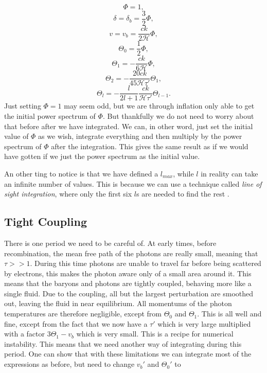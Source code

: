 \documentclass[a4paper,norsk, 10pt]{article}
\begin{document}
\begin{equation}
\Phi = 1,
\end{equation}
\begin{equation}
\delta = \delta_b = \frac{3}{2}\Phi,
\end{equation}
\begin{equation}
v = v_b = \frac{ck}{2\mathcal{H}}\Phi,
\end{equation}
\begin{equation}
\Theta_0 = \frac{1}{2}\Phi,
\end{equation}
\begin{equation}
\Theta_1 = -\frac{ck}{6\mathcal{H}}\Phi,
\end{equation}
\begin{equation}
\Theta_2 = -\frac{20ck}{45\mathcal{H}\tau'}\Theta_1,
\end{equation}
\begin{equation}
\Theta_l = -\frac{l}{2l+1}\frac{ck}{\mathcal{H}\tau'}\Theta_{l-1}.
\end{equation}
Just setting $\Phi = 1$ may seem odd, but we are through inflation only able to get the initial power spectrum of $\Phi$. But thankfully we do not need to worry about that before after we have integrated. We can, in other word, just set the initial value of $\Phi$ as we wish, integrate everything and then multiply by the power spectrum of $\Phi$ after the integration. This gives the same result as if we would have gotten if we just the power spectrum as the initial value. 

An other ting to notice is that we have defined a $l_{max}$, while $l$ in reality can take an infinite number of values. This is because we can use a technique called \textit{line of sight integration}, where only the first six $l$s are needed to find the rest .


\subsection{Tight Coupling}\label{sec:tight}
There is one period we need to be careful of. At early times, before recombination, the mean free path of the photons are really small, meaning that $\tau >> 1$. During this time photons are unable to travel far before being scattered by electrons, this makes the photon aware only of a small area around it. This means that the baryons and photons are tightly coupled, behaving more like a single fluid. Due to the coupling, all but the largest perturbation are smoothed out, leaving the fluid in near equilibrium. All momentums of the photon temperatures are therefore negligible, except from $\Theta_0$ and $\Theta_1$. This is all well and fine, except from the fact that we now have a $\tau'$ which is very large multiplied with a factor $3\Theta_1-v_b$ which is very small. This is a recipe for numerical instability. This means that we need another way of integrating during this period. One can show that with these limitations we can integrate most of the expressions as before, but need to change $v_b'$ and $\Theta_0'$ to
\end{document}
